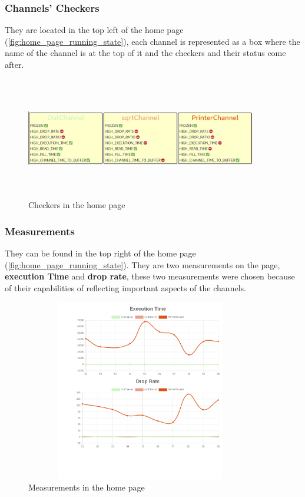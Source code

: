 \subsubsection{Channels' Checkers}
They are located in the top left of the home page (\ref{fig:home_page_running_state}), 
each channel is represented as a box where the name
of the channel is at the top of it and the checkers and their status come after. 
\newline
\begin{figure}[H]
	\centering
	\includegraphics[width=0.9\textwidth,height=200px]{images/checkers_home_page.png}
	\caption{Checkers in the home page}
	\label{fig:checkers_home_page}
\end{figure}

\subsubsection{Measurements}\label{measuremets_home}
They can be found in the top right of the home page (\ref{fig:home_page_running_state}). They are
two measurements on the page, \textbf{execution Time} and \textbf{drop rate}, these two measurements
were chosen because of their capabilities of reflecting important aspects of the channels.
\newline
\begin{figure}[H]
	\centering
	\includegraphics[width=0.9\textwidth,height=300px]{images/measures_home_page.png}
	\caption{Measurements in the home page}
	\label{fig:measures_home_page}
\end{figure}

